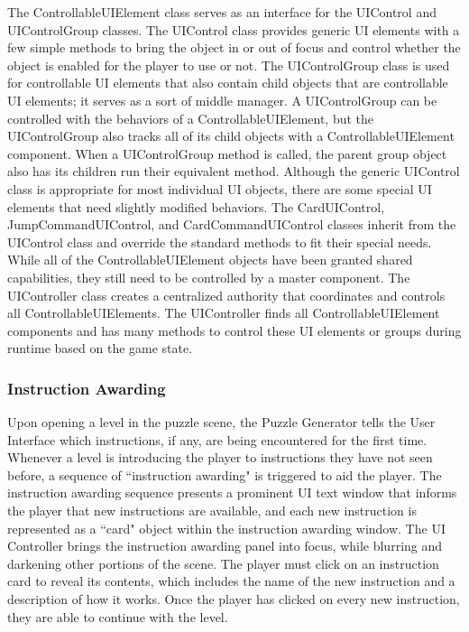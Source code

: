 The ControllableUIElement class serves as an interface for the UIControl and UIControlGroup classes. The UIControl class provides generic UI elements with a few simple methods to bring the object in or out of focus and control whether the object is enabled for the player to use or not. The UIControlGroup class is used for controllable UI elements that also contain child objects that are controllable UI elements; it serves as a sort of middle manager. A UIControlGroup can be controlled with the behaviors of a ControllableUIElement, but the UIControlGroup also tracks all of its child objects with a ControllableUIElement component. When a UIControlGroup method is called, the parent group object also has its children run their equivalent method. Although the generic UIControl class is appropriate for most individual UI objects, there are some special UI elements that need slightly modified behaviors. The CardUIControl, JumpCommandUIControl, and CardCommandUIControl classes inherit from the UIControl class and override the standard methods to fit their special needs.\\

While all of the ControllableUIElement objects have been granted shared capabilities, they still need to be controlled by a master component. The UIController class creates a centralized authority that coordinates and controls all ControllableUIElements. The UIController finds all ControllableUIElement components and has many methods to control these UI elements or groups during runtime based on the game state.\\

\subsubsection{Instruction Awarding}
Upon opening a level in the puzzle scene, the Puzzle Generator tells the User Interface which instructions, if any, are being encountered for the first time. Whenever a level is introducing the player to instructions they have not seen before, a sequence of ``instruction awarding" is triggered to aid the player. The instruction awarding sequence presents a prominent UI text window that informs the player that new instructions are available, and each new instruction is represented as a ``card" object within the instruction awarding window. The UI Controller brings the instruction awarding panel into focus, while blurring and darkening other portions of the scene. The player must click on an instruction card to reveal its contents, which includes the name of the new instruction and a description of how it works. Once the player has clicked on every new instruction, they are able to continue with the level.\\

